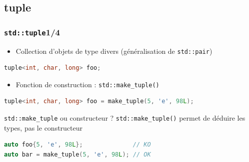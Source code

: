 \documentclass[C++.tex]{subfiles}
\begin{document}
\subsection*{tuple}
\begin{frame}[fragile]
	\frametitle{\lstinline|std::tuple|\titlehfill{}1/4}
	\begin{itemize}
		\item Collection d'objets de type divers (généralisation de \lstinline|std::pair|)
	\end{itemize}

	\begin{lstlisting}[language=C++]
tuple<int, char, long> foo;\end{lstlisting}

	\begin{itemize}
		\item Fonction de construction : \lstinline|std::make_tuple()|
	\end{itemize}

	\begin{lstlisting}[language=C++]
tuple<int, char, long> foo = make_tuple(5, 'e', 98L);\end{lstlisting}

	\begin{block}{\lstinline|std::make_tuple| ou constructeur ?}
		\lstinline|std::make_tuple()| permet de déduire les types, pas le constructeur

		\begin{lstlisting}[language=C++]
auto foo{5, 'e', 98L};              // KO
auto bar = make_tuple(5, 'e', 98L); // OK\end{lstlisting}

	\end{block}
\end{frame}
\end{document}

